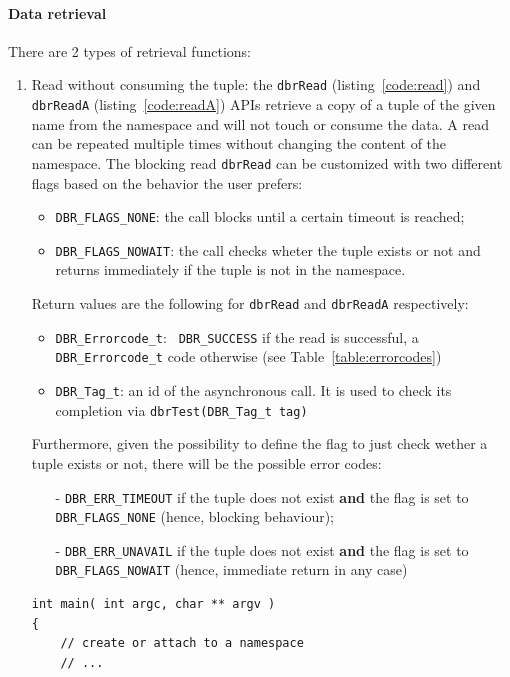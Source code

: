 \paragraph{Data retrieval} There are 2 types of retrieval functions:
\begin{enumerate}
\item Read without consuming the tuple: the \texttt{dbrRead} (listing~\ref{code:read}) and
  \texttt{dbrReadA} (listing~\ref{code:readA}) APIs retrieve a copy of a tuple of the given name from the
  namespace and will not touch or consume the data.  A read can be
  repeated multiple times without changing the content of the
  namespace.
  The blocking read \texttt{dbrRead} can be customized with two different flags based on the behavior the user prefers:
  \begin{itemize}
  	\item \texttt{DBR\_FLAGS\_NONE}: the call blocks until a certain timeout is reached;
  	\item \texttt{DBR\_FLAGS\_NOWAIT}: the call checks wheter the tuple exists or not and returns immediately if the tuple is not in the namespace.
  \end{itemize}

Return values are the following  for \texttt{dbrRead} and \texttt{dbrReadA} respectively:
\begin{itemize}
	\item \texttt{DBR\_Errorcode\_t}: \texttt{ DBR\_SUCCESS} if the read is successful, a \texttt{DBR\_Errorcode\_t} code otherwise (see Table~\ref{table:errorcodes}) 
	\item \texttt{DBR\_Tag\_t}: an id of the asynchronous call. It is used to check its completion via \texttt{dbrTest(DBR\_Tag\_t tag)}
\end{itemize}

Furthermore, given the possibility to define the flag to just check wether a tuple exists or not, there will be the possible error codes:
\begin{itemize}
	\item[-] \texttt{DBR\_ERR\_TIMEOUT} if the tuple does not exist \textbf{and} the flag is set to \texttt{DBR\_FLAGS\_NONE} (hence, blocking behaviour);
	\item [-] \texttt{DBR\_ERR\_UNAVAIL} if the tuple does not exist \textbf{and} the flag is set to \texttt{DBR\_FLAGS\_NOWAIT} (hence, immediate return in any case)
\end{itemize}

\begin{lstlisting}[style=mystyle,basicstyle=\scriptsize\ttfamily,caption=Read data from the namespace (blocking), label=code:read]
int main( int argc, char ** argv )
{
	// create or attach to a namespace
	// ...
	

\end{lstlisting}
\end{enumerate}
